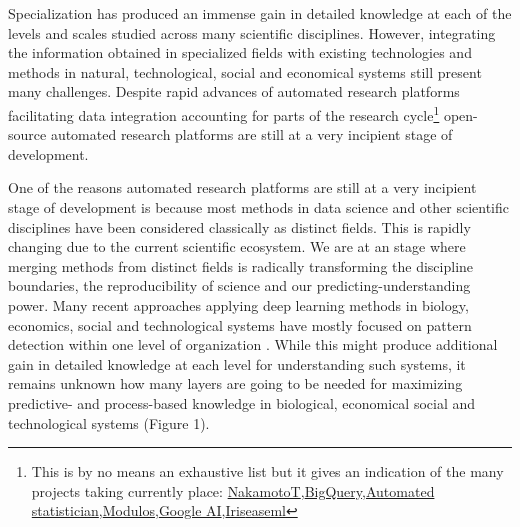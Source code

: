 \documentclass[authoryear,1p,12pt]{elsarticle}
\begin{document}
Specialization has produced an immense gain in detailed knowledge at
each of the levels and scales studied across many scientific
disciplines. However, integrating the information obtained in
specialized fields with existing technologies and methods in natural,
technological, social and economical systems still present many
challenges. Despite rapid advances of automated research platforms
facilitating data integration accounting for parts of the research
cycle\footnote{This is by no means an exhaustive list but it gives an
  indication of the many projects taking currently place:
  \href{https://www.nterminal.com}{NakamotoT},\href{https://cloud.google.com/bigquery/}{BigQuery},\href{https://www.automaticstatistician.com/index/}{Automated
    statistician},\href{http://www.modulos.ai/}{Modulos},\href{https://ai.google/}{Google
    AI},\href{https://iris.ai}{Iris}\href{https://github.com/DS3Lab/easeml}{easeml}}
open-source automated research platforms are still at a very incipient
stage of development.

One of the reasons automated research platforms are still at a very
incipient stage of development is because most methods in data science
and other scientific disciplines have been considered classically as
distinct fields. This is rapidly changing due to the current
scientific ecosystem. We are at an stage where merging methods from
distinct fields is radically transforming the discipline boundaries,
the reproducibility of science and our predicting-understanding
power\citep{Reichsteietal2019}. Many recent approaches applying deep
learning methods in biology, economics, social and technological
systems have mostly focused on pattern detection within one level of
organization \citep{Sheehan&Song:2016}. While this might produce
additional gain in detailed knowledge at each level for understanding
such systems, it remains unknown how many layers are going to be
needed for maximizing predictive- and process-based knowledge in
biological, economical social and technological systems (Figure 1).
\end{document}
